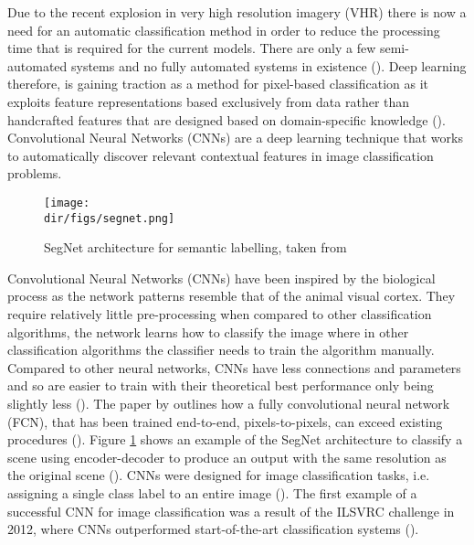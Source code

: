 \par
Due to the recent explosion in very high resolution imagery (VHR) there is now a need for an automatic classification method in order to reduce the processing time that is required for the current models. There are only a few semi-automated systems and no fully automated systems in existence (\cite{baltsavias04,mayer08,mnih13}). Deep learning therefore, is gaining traction as a method for pixel-based classification as it exploits feature representations based exclusively from data rather than handcrafted features that are designed based on domain-specific knowledge (\cite{xiao17,maggiori17a}). Convolutional Neural Networks (CNNs) are a deep learning technique that works to automatically discover relevant contextual features in image classification problems.
\par
\begin{figure}[b]
    \centering
    \texttt{[image: \\dir/figs/segnet.png]}
    \caption{SegNet architecture for semantic labelling, taken from \cite{audebert18}}
    \label{fig.segnet}
\end{figure}
Convolutional Neural Networks (CNNs) have been inspired by the biological process as the network patterns resemble that of the animal visual cortex. They require relatively little pre-processing when compared to other classification algorithms, the network learns how to classify the image where in other classification algorithms the classifier needs to train the algorithm manually. Compared to other neural networks, CNNs have less connections and parameters and so are easier to train with their theoretical best performance only being slightly less (\cite{krizhevsky17}). The paper by \cite{long15} outlines how a fully convolutional neural network (FCN), that has been trained end-to-end, pixels-to-pixels, can exceed existing procedures (\cite{shelhamer17}). Figure \ref{fig.segnet} shows an example of the SegNet architecture to classify a scene using encoder-decoder to produce an output with the same resolution as the original scene (\cite{audebert18}). CNNs were designed for image classification tasks, i.e. assigning a single class label to an entire image (\cite{volpi17}). The first example of a successful CNN for image classification was a result of the ILSVRC challenge in 2012, where CNNs outperformed start-of-the-art classification systems (\cite{marmanis16,volpi17,krizhevsky17}).
